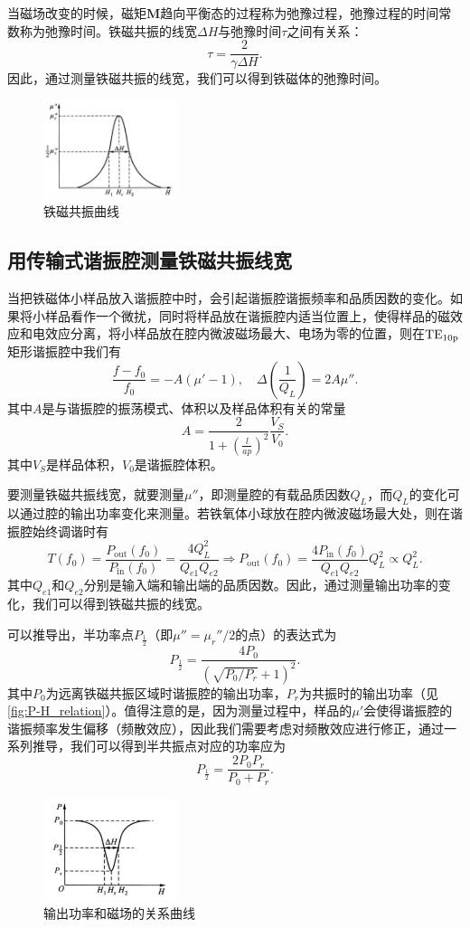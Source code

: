 \documentclass[font=default]{mpltx}
\begin{document}
当磁场改变的时候，磁矩$\bm{M}$趋向平衡态的过程称为弛豫过程，弛豫过程的时间常数称为弛豫时间。铁磁共振的线宽$\Delta H$与弛豫时间$\tau$之间有关系：$$\tau=\frac{2}{\gamma\Delta H}.$$因此，通过测量铁磁共振的线宽，我们可以得到铁磁体的弛豫时间。
\begin{figure}
  \centering
  \includegraphics[width=0.35\textwidth]{fig/ferro_reso.png}
  \caption{铁磁共振曲线}
  \label{fig:ferro_reso}
\end{figure}

\subsection{用传输式谐振腔测量铁磁共振线宽}
当把铁磁体小样品放入谐振腔中时，会引起谐振腔谐振频率和品质因数的变化。如果将小样品看作一个微扰，同时将样品放在谐振腔内适当位置上，使得样品的磁效应和电效应分离，将小样品放在腔内微波磁场最大、电场为零的位置，则在$\rm TE_{10p}$矩形谐振腔中我们有
$$
\frac{f-f_0}{f_0}=-A(\mu'-1),\quad \Delta\left(\frac{1}{Q_L}\right)=2A\mu''.
$$其中$A$是与谐振腔的振荡模式、体积以及样品体积有关的常量$$A=\frac{2}{1+\left(\frac{l}{ap}\right)^2}\frac{V_S}{V_0}.$$其中$V_S$是样品体积，$V_0$是谐振腔体积。

要测量铁磁共振线宽，就要测量$\mu''$，即测量腔的有载品质因数$Q_L$，而$Q_L$的变化可以通过腔的输出功率变化来测量。若铁氧体小球放在腔内微波磁场最大处，则在谐振腔始终调谐时有
$$
T(f_0)=\frac{P_{\text{out}}(f_0)}{P_{\text{in}}(f_0)}=\frac{4Q^2_L}{Q_{e1}Q_{e2}}\Longrightarrow P_{\text{out}}(f_0)=\frac{4P_{\text{in}}(f_0)}{Q_{e1}Q_{e2}}Q^2_L\propto Q^2_L.
$$其中$Q_{e1}$和$Q_{e2}$分别是输入端和输出端的品质因数。因此，通过测量输出功率的变化，我们可以得到铁磁共振的线宽。

可以推导出，半功率点$P_{\frac12}$（即$\mu''=\mu_r''/2$的点）的表达式为$$P_{\frac12}=\frac{4P_0}{(\sqrt{P_0/P_r}+1)^2}.$$其中$P_0$为远离铁磁共振区域时谐振腔的输出功率，$P_r$为共振时的输出功率（见\autoref{fig:P-H_relation}）。值得注意的是，因为测量过程中，样品的$\mu'$会使得谐振腔的谐振频率发生偏移（频散效应），因此我们需要考虑对频散效应进行修正，通过一系列推导，我们可以得到半共振点对应的功率应为
$$
P_{\frac12}=\frac{2P_0P_r}{P_0+P_r}.
$$

\begin{figure}
  \centering
  \includegraphics[width=0.35\textwidth]{fig/P-H_relation.png}
  \caption{输出功率和磁场的关系曲线}
  \label{fig:P-H_relation}
\end{figure}
\end{document}
